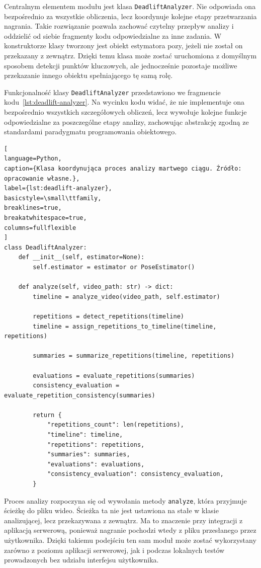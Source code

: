 Centralnym elementem modułu jest klasa \texttt{DeadliftAnalyzer}. Nie odpowiada ona bezpośrednio za wszystkie obliczenia, lecz koordynuje kolejne etapy przetwarzania nagrania. Takie rozwiązanie pozwala zachować czytelny przepływ analizy i oddzielić od siebie fragmenty kodu odpowiedzialne za inne zadania. W konstruktorze klasy tworzony jest obiekt estymatora pozy, jeżeli nie został on przekazany z zewnątrz. Dzięki temu klasa może zostać uruchomiona z domyślnym sposobem detekcji punktów kluczowych, ale jednocześnie pozostaje możliwe przekazanie innego obiektu spełniającego tę samą rolę.

Funkcjonalność klasy \texttt{DeadliftAnalyzer} przedstawiono we fragmencie kodu~\ref{lst:deadlift-analyzer}. Na wycinku kodu widać, że nie implementuje ona bezpośrednio wszystkich szczegółowych obliczeń, lecz wywołuje kolejne funkcje odpowiedzialne za poszczególne etapy analizy, zachowując abstrakcję zgodną ze standardami paradygmatu programowania obiektowego.

\begin{lstlisting}[
language=Python,
caption={Klasa koordynująca proces analizy martwego ciągu. Źródło: opracowanie własne.},
label={lst:deadlift-analyzer},
basicstyle=\small\ttfamily,
breaklines=true,
breakatwhitespace=true,
columns=fullflexible
]
class DeadliftAnalyzer:
    def __init__(self, estimator=None):
        self.estimator = estimator or PoseEstimator()

    def analyze(self, video_path: str) -> dict:
        timeline = analyze_video(video_path, self.estimator)

        repetitions = detect_repetitions(timeline)
        timeline = assign_repetitions_to_timeline(timeline, repetitions)

        summaries = summarize_repetitions(timeline, repetitions)

        evaluations = evaluate_repetitions(summaries)
        consistency_evaluation = evaluate_repetition_consistency(summaries)

        return {
            "repetitions_count": len(repetitions),
            "timeline": timeline,
            "repetitions": repetitions,
            "summaries": summaries,
            "evaluations": evaluations,
            "consistency_evaluation": consistency_evaluation,
        }
\end{lstlisting}

Proces analizy rozpoczyna się od wywołania metody \texttt{analyze}, która przyjmuje ścieżkę do pliku wideo. Ścieżka ta nie jest ustawiona na stałe w klasie analizującej, lecz przekazywana z zewnątrz. Ma to znaczenie przy integracji z aplikacją serwerową, ponieważ nagranie pochodzi wtedy z pliku przesłanego przez użytkownika. Dzięki takiemu podejściu ten sam moduł może zostać wykorzystany zarówno z poziomu aplikacji serwerowej, jak i podczas lokalnych testów prowadzonych bez udziału interfejsu użytkownika.

